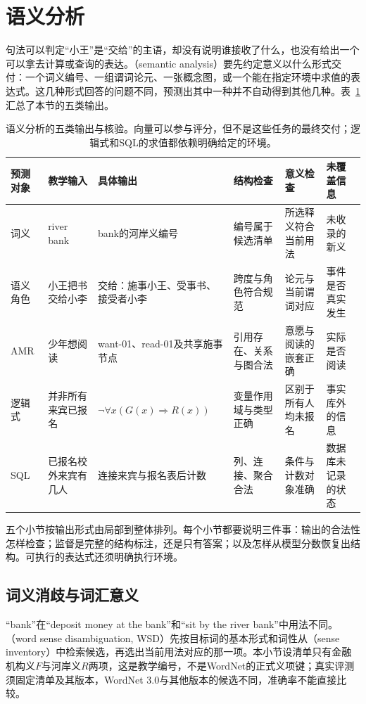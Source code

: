 \section{语义分析}
\label{sec:nlp-analysis-semantics}

句法可以判定“小王”是“交给”的主语，却没有说明谁接收了什么，也没有给出一个可以拿去计算或查询的表达。（semantic analysis）要先约定意义以什么形式交付：一个词义编号、一组谓词论元、一张概念图，或一个能在指定环境中求值的表达式。这几种形式回答的问题不同，预测出其中一种并不自动得到其他几种。表~\ref{tab:nlp-analysis-semantic-outputs}汇总了本节的五类输出。

\begin{table}[htbp]
  \centering
  \small
  \setlength{\tabcolsep}{3pt}
  \begin{tabular}{@{}p{15mm}p{24mm}p{32mm}p{24mm}p{27mm}p{28mm}@{}}
    \toprule
    预测对象&教学输入&具体输出&结构检查&意义检查&未覆盖信息\\
    \midrule
    词义&river bank&bank的河岸义编号&编号属于候选清单&所选释义符合当前用法&未收录的新义\\
    语义角色&小王把书交给小李&交给：施事小王、受事书、接受者小李&跨度与角色符合规范&论元与当前谓词对应&事件是否真实发生\\
    AMR&少年想阅读&want-01、read-01及共享施事节点&引用存在、关系与图合法&意愿与阅读的嵌套正确&实际是否阅读\\
    逻辑式&并非所有来宾已报名&$\neg\forall x(G(x)\Rightarrow R(x))$&变量作用域与类型正确&区别于所有人均未报名&事实库外的信息\\
    SQL&已报名校外来宾有几人&连接来宾与报名表后计数&列、连接、聚合合法&条件与计数对象准确&数据库未记录的状态\\
    \bottomrule
  \end{tabular}
  \caption{语义分析的五类输出与核验。向量可以参与评分，但不是这些任务的最终交付；逻辑式和SQL的求值都依赖明确给定的环境。}
  \label{tab:nlp-analysis-semantic-outputs}
\end{table}

五个小节按输出形式由局部到整体排列。每个小节都要说明三件事：输出的合法性怎样检查；监督是完整的结构标注，还是只有答案；以及怎样从模型分数恢复出结构。可执行的表达式还须明确执行环境。

\subsection{词义消歧与词汇意义}
\label{sec:nlp-analysis-wsd}

“bank”在“deposit money at the bank”和“sit by the river bank”中用法不同。（word sense disambiguation, WSD）先按目标词的基本形式和词性从（sense inventory）中检索候选，再选出当前用法对应的那一项。本小节设清单只有金融机构义$F$与河岸义$R$两项，这是教学编号，不是WordNet的正式义项键；真实评测须固定清单及其版本，WordNet 3.0与其他版本的候选不同，准确率不能直接比较。


